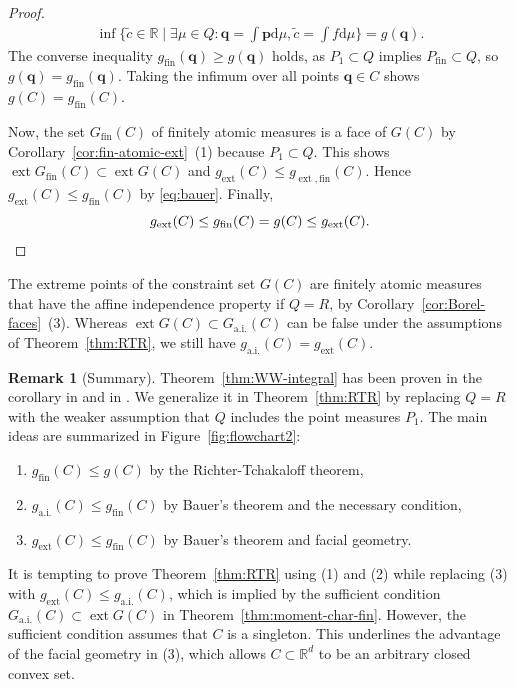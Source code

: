 \documentclass[a4paper,11pt,reqno]{amsart}
\numberwithin{equation}{section}
\theoremstyle{plain}
\theoremstyle{definition}
\newtheorem{remark}[theorem]{Remark}
\newcommand{\bp}{\mathbf{p}}
\newcommand{\bq}{\mathbf{q}}
\newcommand{\dd}{\mathrm{d}} %
\newcommand{\R}{\mathbb{R}} %
\DeclareMathOperator{\ext}{ext} %
\newcommand\ait{\mathrm{a.i.}}
\newcommand\extt{\mathrm{ext}}
\newcommand\fint{\mathrm{fin}}
\begin{document}
\begin{proof}
\begin{align*}
 \inf\{\tilde c\in\R \mid \exists \mu\in Q
 : \bq=\int\bp\dd\mu, \tilde c=\int f\dd\mu\}
 =g(\bq).
\end{align*} 
The converse inequality $g_\fint(\bq)\geq g(\bq)$ holds, as $P_1\subset Q$ 
implies $P\!_\fint\subset Q$, so $g(\bq)=g_\fint(\bq)$. Taking the infimum 
over all points $\bq\in C$ shows $g(C)=g_\fint(C)$.
\par
%
Now, the set $G_\fint(C)$ of finitely atomic measures is a face of $G(C)$ by 
Corollary~\ref{cor:fin-atomic-ext}~(1) because $P_1\subset Q$. This shows 
$\ext G_\fint(C)\subset\ext G(C)$ and $g_\extt(C)\leq g_{\ext,\fint}(C)$. 
Hence $g_\extt(C)\leq g_\fint(C)$ by \eqref{eq:bauer}. Finally, 
\[
g_\extt(C)
\leq g_\fint(C)
= g(C)
\leq g_\extt(C).
\qedhere
\]
\end{proof}
%
The extreme points of the constraint set $G(C)$ are finitely atomic measures that have the 
affine independence property if $Q=R$, by Corollary~\ref{cor:Borel-faces}~(3). Whereas 
$\ext G(C)\subset G_\ait(C)$ can be false under the assumptions of Theorem~\ref{thm:RTR}, 
we still have $g_\ait(C)=g_\extt(C)$.
\par
%
\begin{remark}[Summary]\label{rem:our-contrib-opti}
Theorem~\ref{thm:WW-integral} has been proven in the corollary in 
\cite[p.~138]{weizsaecker-winkler80} and in \cite[Theorem~3.2]{winkler88}. We generalize
it in Theorem~\ref{thm:RTR} by replacing $Q=R$ with the weaker assumption that $Q$ 
includes the point measures $P_1$. The main ideas are summarized in 
Figure~\ref{fig:flowchart2}:
\begin{enumerate}
\item
$g_\fint(C)\leq g(C)$ by the Richter-Tchakaloff theorem,
\item
$g_\ait(C)\leq g_\fint(C)$ by Bauer's theorem and the necessary
condition,
\item
$g_\extt(C)\leq g_\fint(C)$ by Bauer's theorem and facial geometry.
\end{enumerate}
It is tempting to prove Theorem~\ref{thm:RTR} using (1) and (2) while replacing (3) 
with $g_\extt(C)\leq g_\ait(C)$, which is implied by the sufficient condition 
$G_\ait(C)\subset\ext G(C)$ in Theorem~\ref{thm:moment-char-fin}. However, the 
sufficient condition assumes that $C$ is a singleton. This underlines the advantage 
of the facial geometry in (3), which allows $C\subset\R^d$ to be an arbitrary closed 
convex set.
\end{remark}
% 
%
\end{document}
